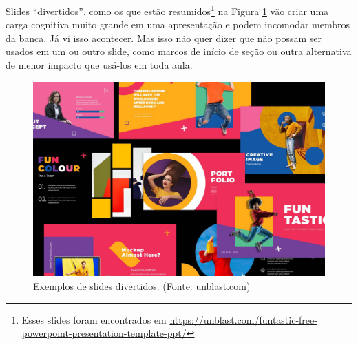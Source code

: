 Slides ``divertidos'', como os que estão resumidos\footnote{Esses slides foram encontrados em     \url{https://unblast.com/funtastic-free-powerpoint-presentation-template-ppt/}
} na Figura \ref{fig:fun} vão criar uma carga cognitiva muito grande em uma apresentação e podem incomodar membros da banca. Já vi isso acontecer. Mas isso não quer dizer que não possam ser usados em um ou outro slide, como marcos de início de seção ou outra alternativa de menor impacto que usá-los em toda aula.

\begin{figure}[hbt]
    \centering
    \includegraphics[width=\tam\linewidth]{imagens/funslide.jpg}
    \caption{Exemplos de slides divertidos.
        (Fonte: unblast.com) }
    \label{fig:fun}
\end{figure}
